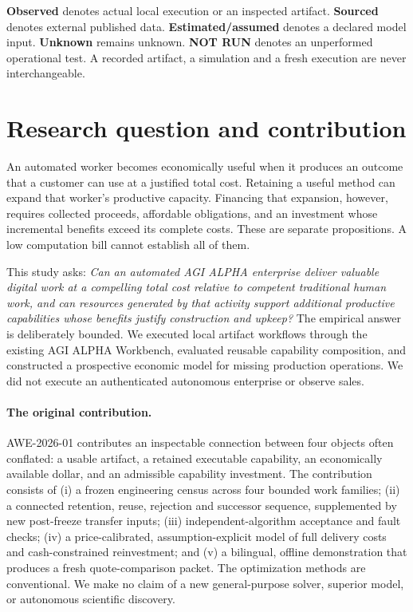\begin{tcolorbox}[colback=lavender,colframe=purple,title={Reading the evidence}]
\textbf{Observed} denotes actual local execution or an inspected artifact. \textbf{Sourced} denotes external published data. \textbf{Estimated/assumed} denotes a declared model input. \textbf{Unknown} remains unknown. \textbf{NOT RUN} denotes an unperformed operational test. A recorded artifact, a simulation and a fresh execution are never interchangeable.
\end{tcolorbox}
\clearpage
\tableofcontents
\clearpage
\section{Research question and contribution}

An automated worker becomes economically useful when it produces an outcome that a customer can use at a justified total cost. Retaining a useful method can expand that worker's productive capacity. Financing that expansion, however, requires collected proceeds, affordable obligations, and an investment whose incremental benefits exceed its complete costs. These are separate propositions. A low computation bill cannot establish all of them.

This study asks: \emph{Can an automated AGI ALPHA enterprise deliver valuable digital work at a compelling total cost relative to competent traditional human work, and can resources generated by that activity support additional productive capabilities whose benefits justify construction and upkeep?} The empirical answer is deliberately bounded. We executed local artifact workflows through the existing AGI ALPHA Workbench, evaluated reusable capability composition, and constructed a prospective economic model for missing production operations. We did not execute an authenticated autonomous enterprise or observe sales.

\paragraph{The original contribution.} AWE-2026-01 contributes an inspectable connection between four objects often conflated: a usable artifact, a retained executable capability, an economically available dollar, and an admissible capability investment. The contribution consists of (i) a frozen engineering census across four bounded work families; (ii) a connected retention, reuse, rejection and successor sequence, supplemented by new post-freeze transfer inputs; (iii) independent-algorithm acceptance and fault checks; (iv) a price-calibrated, assumption-explicit model of full delivery costs and cash-constrained reinvestment; and (v) a bilingual, offline demonstration that produces a fresh quote-comparison packet. The optimization methods are conventional. We make no claim of a new general-purpose solver, superior model, or autonomous scientific discovery.

